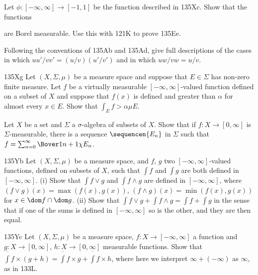 { Let $\phi:[-\infty,\infty]\to[-1,1]$ be the
function described in 135Xc.   Show that the functions




\noindent are Borel measurable.   Use this with 121K to prove 135Ee.

 Following the conventions of 135Ab and 135Ad,
give  full descriptions of the cases in which $uu'/vv'=(u/v)(u'/v')$ and
in which $uw/vw=u/v$.

\spheader 135Xg Let $(X,\Sigma,\mu)$ be a measure space and suppose that 
$E\in\Sigma$ has non-zero finite measure.   Let $f$ be a virtually
measurable $[-\infty,\infty]$-valued function defined on a subset of $X$ and suppose that $f(x)$ is defined and greater than $\alpha$ for almost every $x\in E$.   Show that $\int_Ef>\alpha\mu E$.

Let $X$ be a set and $\Sigma$ a $\sigma$-algebra of subsets of $X$.   
Show that if $f:X\to[0,\infty]$ is $\Sigma$-measurable, there is a 
sequence $\sequencen{E_n}$ in $\Sigma$ such that 
$f=\sum_{n=0}^{\infty}\Bover1{n+1}\chi E_n$.

\spheader 135Yb Let $(X,\Sigma,\mu)$ be a measure space, and $f$, $g$ two
$[-\infty,\infty]$-valued functions, defined on subsets of $X$, such that
$\int f$ and $\int g$ are both defined in $[-\infty,\infty]$.   
(i) Show that
$\int f\vee g$ and $\int f\wedge g$ are defined in $[-\infty,\infty]$,
where $(f\vee g)(x)=\max(f(x),g(x))$, $(f\wedge g)(x)=\min(f(x),g(x))$ for
$x\in\dom f\cap\dom g$.   (ii) Show that 
$\int f\vee g+\int f\wedge g=\int f+\int g$ in the sense that if one of the
sums is defined in $[-\infty,\infty]$ so is the other, and they are then
equal.

\spheader 135Yc 
Let $(X,\Sigma,\mu)$ be a measure space, 
$f:X\to[-\infty,\infty]$ a function and $g:X\to[0,\infty]$, 
$h:X\to[0,\infty]$ measurable functions.   Show that 
$\overline{\int}f\times(g+h) 
=\overline{\int}f\times g+\overline{\int}f\times h$, where here
we interpret $\infty+(-\infty)$ as $\infty$, as in 133L. 
}%

